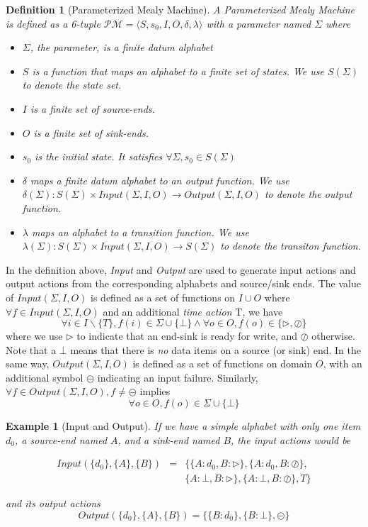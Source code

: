 \documentclass[conference, a4paper]{IEEEtran}
\newtheorem{definition}{Definition}
\newtheorem{example}{Example}
\newcommand{\rblock}[0]{\circleddash}
\newcommand{\rread}[0]{\rhd}
\newcommand{\rnoread}[0]{\oslash}
\begin{document}
\begin{definition}[Parameterized Mealy Machine]
  A \emph{Parameterized Mealy Machine} is defined as a 6-tuple $\mathcal{PM}=\langle
  S, s_0, I, O, \delta, \lambda\rangle$ with a parameter named $\Sigma$ where 
  \begin{itemize}
    \item[-] $\Sigma$, the parameter, is a \emph{finite} datum alphabet
    \item[-] $S$ is a function that maps an alphabet to a \emph{finite} set of
      states. We use $S(\Sigma)$ to denote the state set.
    \item[-] $I$ is a finite set of source-ends.
    \item[-] $O$ is a finite set of sink-ends.
    \item[-] $s_0$ is the initial state. It satisfies $\forall \Sigma,s_0\in S(\Sigma)$
    \item[-] $\delta$ maps a \emph{finite} datum alphabet to an \emph{output function}. We use
      $\delta(\Sigma):S(\Sigma)\times Input(\Sigma,I,O)\rightarrow Output(\Sigma,I,O)$ to denote the
      output function.
    \item[-] $\lambda$ maps an alphabet to a \emph{transition function}. We use
      $\lambda(\Sigma):S(\Sigma)\times Input(\Sigma,I,O)\rightarrow S(\Sigma)$ to denote the transiton
      function.
  \end{itemize}
\end{definition}

In the definition above, \emph{Input} and \emph{Output} are used to generate input actions
and output actions from the corresponding alphabets and source/sink ends. The value of $Input(\Sigma,I,O)$ is
defined as a set of functions on $I\cup O$ where $\forall f\in Input(\Sigma,I,O)$ and an additional
\emph{time action} T, we have
\[
\forall i\in I\backslash\{T\}, f(i)\in \Sigma\cup\{\bot\}\land \forall o\in
O,f(o)\in\{\rread, \rnoread\}
\]
where we use $\rread$ to indicate that an end-sink is ready for write, and $\rnoread$ otherwise. Note
that a $\bot$ means that there is \emph{no} data items on a source (or sink) end. In the same way,
$Output(\Sigma,I,O)$ is defined as a set of functions on domain $O$, with an additional symbol
$\rblock$ indicating an input failure. Similarly, $\forall f\in Output(\Sigma,I,O), f\neq \rblock$
implies
\[
\forall o\in O, f(o)\in \Sigma\cup\{\bot\}
\]

\begin{example}[Input and Output]
  If we have a simple alphabet with only one item $d_0$, a source-end named $A$, and a
  sink-end named $B$, the input actions would be
  \begin{small}
    \begin{eqnarray*}
      Input(\{d_0\},\{A\},\{B\}) &=& \{\{A:d_0,B:\rread\},\{A:d_0,B:\rnoread\}, \\
      & & \{A:\bot,B:\rread\},\{A:\bot,B:\rnoread\},T\}
    \end{eqnarray*}
  \end{small}
  and its output actions
  \[
  Output(\{d_0\},\{A\},\{B\}) =\{\{B:d_0\},\{B:\bot\}, \rblock\}
  \]
\end{example}
\end{document}

